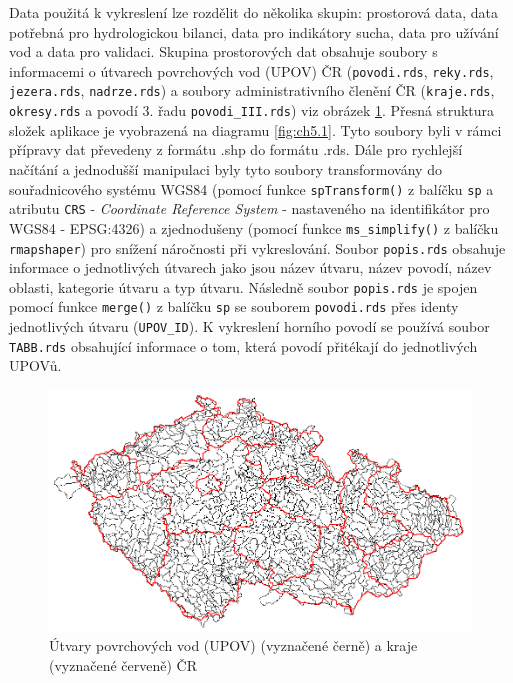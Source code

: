 \documentclass[12pt,]{article}
\begin{document}
\qquad Data použitá k vykreslení lze rozdělit do několika skupin:
prostorová data, data potřebná pro hydrologickou bilanci, data pro
indikátory sucha, data pro užívání vod a data pro validaci. Skupina
prostorových dat obsahuje soubory s informacemi o útvarech povrchových
vod (UPOV) ČR (\texttt{povodi.rds}, \texttt{reky.rds},
\texttt{jezera.rds}, \texttt{nadrze.rds}) a soubory administrativního
členění ČR (\texttt{kraje.rds}, \texttt{okresy.rds} a povodí 3. řadu
\texttt{povodi\_III.rds}) viz obrázek \ref{fig:ch5.0}. Přesná struktura
složek aplikace je vyobrazená na diagramu \ref{fig:ch5.1}. Tyto soubory
byli v rámci přípravy dat převedeny z formátu .shp do formátu .rds. Dále
pro rychlejší načítání a jednodušší manipulaci byly tyto soubory
transformovány do souřadnicového systému WGS84 (pomocí funkce
\texttt{spTransform()} z balíčku \texttt{sp} a atributu \texttt{CRS} -
\emph{Coordinate Reference System} - nastaveného na identifikátor pro
WGS84 - EPSG:4326) a zjednodušeny (pomocí funkce \texttt{ms\_simplify()}
z balíčku \texttt{rmapshaper}) pro snížení náročnosti při vykreslování.
Soubor \texttt{popis.rds} obsahuje informace o jednotlivých útvarech
jako jsou název útvaru, název povodí, název oblasti, kategorie útvaru a
typ útvaru. Následně soubor \texttt{popis.rds} je spojen pomocí funkce
\texttt{merge()} z balíčku \texttt{sp} se souborem \texttt{povodi.rds}
přes identy jednotlivých útvaru (\texttt{UPOV\_ID}). K vykreslení
horního povodí se používá soubor \texttt{TABB.rds} obsahující informace
o tom, která povodí přitékají do jednotlivých UPOVů.

\begin{figure}[H]
      \includegraphics[width=\textwidth]{fig/povodi-kraje}
      \caption{Útvary povrchových vod (UPOV) (vyznačené černě) a kraje (vyznačené červeně) ČR}
      \label{fig:ch5.0}
\end{figure}
\end{document}
